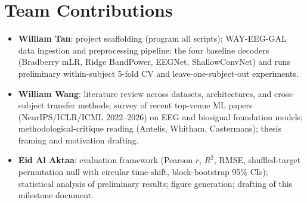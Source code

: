 \documentclass{article}
\begin{document}
\section{Team Contributions}

\begin{itemize}
    \item \textbf{William Tan}: project scaffolding (program all scripts); WAY-EEG-GAL data ingestion and preprocessing pipeline; the four baseline decoders (Bradberry mLR, Ridge BandPower, EEGNet, ShallowConvNet) and runs preliminary within-subject 5-fold CV and leave-one-subject-out experiments.
    \item \textbf{William Wang}: literature review across datasets, architectures, and cross-subject transfer methods; survey of recent top-venue ML papers (NeurIPS/ICLR/ICML 2022--2026) on EEG and biosignal foundation models; methodological-critique reading (Antelis, Whitham, Castermans); thesis framing and motivation drafting.
    \item \textbf{Eid Al Aktaa}: evaluation framework (Pearson $r$, $R^2$, RMSE, shuffled-target permutation null with circular time-shift, block-bootstrap 95\% CIs); statistical analysis of preliminary results; figure generation; drafting of this milestone document.
\end{itemize}

\pagebreak
\end{document}
